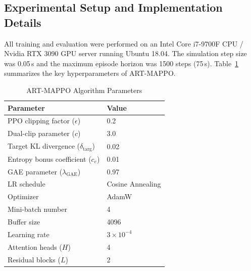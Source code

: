 \documentclass[lettersize,journal]{IEEEtran}
\providecommand{\DIFadd}[1]{{\protect\color{blue} #1}} %
\providecommand{\DIFaddbegin}{} %
\providecommand{\DIFaddend}{} %
\begin{document}
\subsection{Experimental Setup and Implementation Details}
\label{subsec:setup}

All training and evaluation were performed on an Intel Core i7-9700F CPU / Nvidia RTX 3090
GPU server running Ubuntu 18.04.
The simulation step size was 0.05\,s \DIFaddbegin \DIFadd{and the maximum episode horizon was
1500 steps (75\,s)}\DIFaddend .
Table~\ref{table2} summarizes the key hyperparameters of ART-MAPPO.

\begin{table}[!t]
\centering
\renewcommand{\arraystretch}{1.4}
\caption{ART-MAPPO Algorithm Parameters}
\label{table2}
\begin{tabular}{ll}
\hline\hline
Parameter & Value \\ \hline
PPO clipping factor ($\epsilon$) & 0.2 \\
Dual-clip parameter ($c$) & 3.0 \\
Target KL divergence ($\delta_{\text{targ}}$) & 0.02 \\
Entropy bonus coefficient ($c_e$) & 0.01 \\
GAE parameter ($\lambda_{\mathrm{GAE}}$) & 0.97 \\
LR schedule & Cosine Annealing \\
Optimizer & AdamW \\
Mini-batch number & 4 \\
Buffer size & 4096 \\
Learning rate & $3\times10^{-4}$ \\
Attention heads ($H$) & 4 \\
Residual blocks ($L$) & 2 \\ \hline
\end{tabular}
\end{table}
\end{document}
